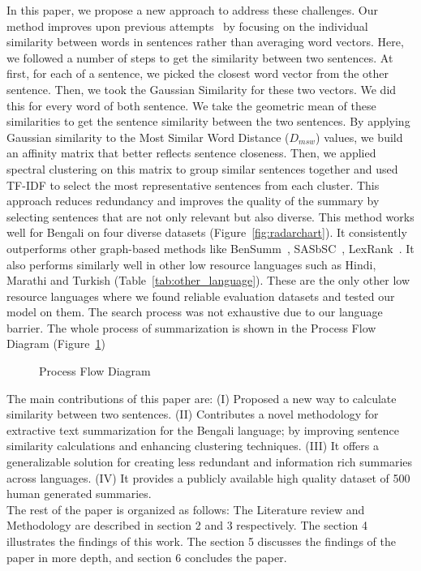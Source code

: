 In this paper, we propose a new approach to address these challenges. Our method improves upon previous attempts~\cite{roychowdhury-etal-2022-spectral-base} by focusing on the individual similarity between words in sentences rather than averaging word vectors. Here, we followed a number of steps to get the similarity between two sentences. At first, for each of a sentence, we picked the closest word vector from the other sentence. Then, we took the Gaussian Similarity for these two vectors. We did this  for every word of both sentence. We take the geometric mean of these similarities to get the sentence similarity between the two sentences. By applying Gaussian similarity to the Most Similar Word Distance ($D_{msw}$) values, we build an affinity matrix that better reflects sentence closeness. Then, we applied spectral clustering on this matrix to group similar sentences together and used TF-IDF to select the most representative sentences from each cluster. This approach reduces redundancy and improves the quality of the summary by selecting sentences that are not only relevant but also diverse. This method works well for Bengali on four diverse datasets (Figure~\ref{fig:radarchart}). It consistently outperforms other graph-based methods like BenSumm~\cite{chowdhury-etal-2021-tfidf-clustering}, SASbSC~\cite{roychowdhury-etal-2022-spectral-base}, LexRank~\cite{Erkan-lexRank-2004}. It also performs similarly well in other low resource languages such as Hindi, Marathi and Turkish (Table~\ref{tab:other_language}). These are the only other low resource languages where we found reliable evaluation datasets and tested our model on them. The search process was not exhaustive due to our language barrier. The whole process of summarization is shown in the Process Flow Diagram (Figure~\ref{fig:process-flow-diagram})\\

\begin{figure}
    \centering
    
    \caption{Process Flow Diagram}
    \label{fig:process-flow-diagram}
\end{figure}

The main contributions of this paper are:
(I) Proposed a new way to calculate similarity between two sentences.
(II) Contributes a novel methodology for extractive text summarization for the Bengali language; by improving sentence similarity calculations and enhancing clustering techniques.
(III) It offers a generalizable solution for creating less redundant and information rich summaries across languages.
(IV) It provides a publicly available high quality dataset of 500 human generated summaries.\\

The rest of the paper is organized as follows: The Literature review and Methodology are described in section 2 and 3 respectively. The section 4 illustrates the findings of this work. The section 5 discusses the findings of the paper in more depth, and section 6 concludes the paper.